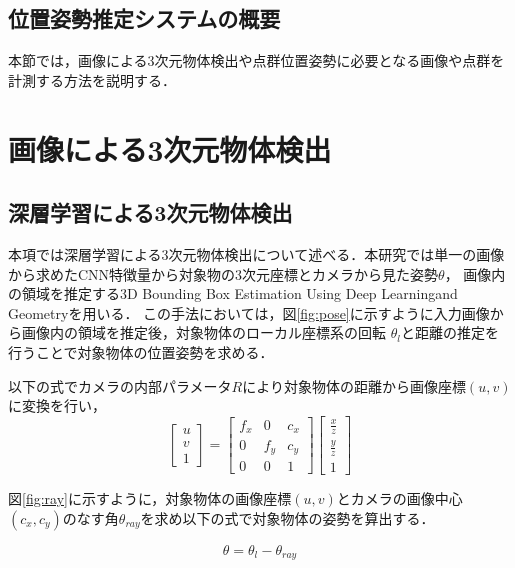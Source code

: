 \subsection{位置姿勢推定システムの概要}
本節では，画像による3次元物体検出や点群位置姿勢に必要となる画像や点群を計測する方法を説明する．

\newpage
\section{画像による3次元物体検出}
\subsection{深層学習による3次元物体検出}
本項では深層学習による3次元物体検出について述べる．本研究では単一の画像から求めたCNN特徴量から対象物の3次元座標とカメラから見た姿勢$\theta$，
画像内の領域を推定する3D Bounding Box Estimation Using Deep Learningand Geometry\cite{2017}を用いる．
この手法においては，図\ref{fig:pose}に示すように入力画像から画像内の領域を推定後，対象物体のローカル座標系の回転 $\theta_l$と距離の推定を行うことで対象物体の位置姿勢を求める．

以下の式でカメラの内部パラメータ$R$により対象物体の距離から画像座標$(u, v)$に変換を行い，
\begin{equation}
\begin{bmatrix}u  \\v \\1 \end{bmatrix}
=\begin{bmatrix}f_x & 0 & c_x\\0 & f_y & c_y\\0 &0 &1 \end{bmatrix}
\begin{bmatrix}\frac{x}{z}  \\\frac{y}{z} \\1 \end{bmatrix}
\end{equation}


図\ref{fig:ray}に示すように，対象物体の画像座標$(u, v)$とカメラの画像中心$(c_x, c_y)$のなす角$\theta_{ray}$を求め以下の式で対象物体の姿勢を算出する．


\begin{equation}
    \theta =
     \theta_l-\theta_{ray}
 \end{equation}


